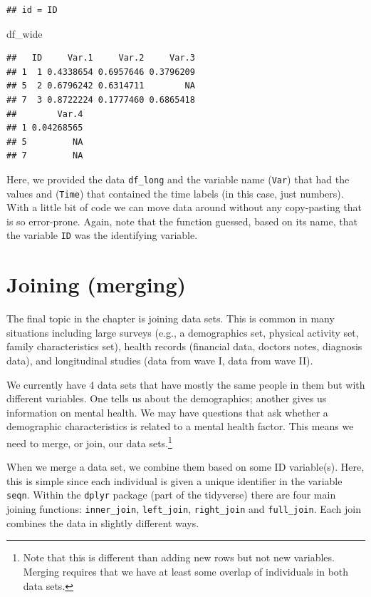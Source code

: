 \documentclass[]{tufte-book}
\newenvironment{Shaded}{}{}
\newcommand{\NormalTok}[1]{#1}
\theoremstyle{definition}
\theoremstyle{definition}
\theoremstyle{remark}
\begin{document}
\begin{verbatim}
## id = ID
\end{verbatim}

\begin{Shaded}
\begin{Highlighting}[]
\NormalTok{df_wide}
\end{Highlighting}
\end{Shaded}

\begin{verbatim}
##   ID     Var.1     Var.2     Var.3
## 1  1 0.4338654 0.6957646 0.3796209
## 5  2 0.6796242 0.6314711        NA
## 7  3 0.8722224 0.1777460 0.6865418
##        Var.4
## 1 0.04268565
## 5         NA
## 7         NA
\end{verbatim}

Here, we provided the data \texttt{df\_long} and the variable name
(\texttt{Var}) that had the values and (\texttt{Time}) that contained
the time labels (in this case, just numbers). With a little bit of code
we can move data around without any copy-pasting that is so error-prone.
Again, note that the function guessed, based on its name, that the
variable \texttt{ID} was the identifying variable.

\section*{Joining (merging)}\label{joining-merging}

The final topic in the chapter is joining data sets. This is common in
many situations including large surveys (e.g., a demographics set,
physical activity set, family characteristics set), health records
(financial data, doctors notes, diagnosis data), and longitudinal
studies (data from wave I, data from wave II).

We currently have 4 data sets that have mostly the same people in them
but with different variables. One tells us about the demographics;
another gives us information on mental health. We may have questions
that ask whether a demographic characteristics is related to a mental
health factor. This means we need to merge, or join, our data
sets.\footnote{Note that this is different than adding new rows but not
  new variables. Merging requires that we have at least some overlap of
  individuals in both data sets.}

When we merge a data set, we combine them based on some ID variable(s).
Here, this is simple since each individual is given a unique identifier
in the variable \texttt{seqn}. Within the \texttt{dplyr} package (part
of the tidyverse) there are four main joining functions:
\texttt{inner\_join}, \texttt{left\_join}, \texttt{right\_join} and
\texttt{full\_join}. Each join combines the data in slightly different
ways.
\end{document}
